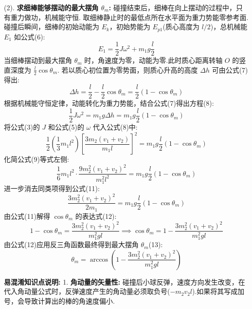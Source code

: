 (2). \textbf{求细棒能够摆动的最大摆角 $\theta_m$:}
碰撞结束后，细棒在向上摆动的过程中，只有重力做功，机械能守恒.
取细棒静止时的最低点所在水平面为重力势能零参考面.
碰撞后瞬间，细棒的初始动能为 $E_k$，初始势能为 $E_{p1}$(质心高度为 $l/2$)，总机械能 $E_1$ 如公式(6):
\begin{equation}
	E_1 = \frac{1}{2}J\omega^2 + m_1 g \frac{l}{2}
\end{equation}
当细棒摆动到最大摆角 $\theta_m$ 时，角速度为零，动能为零.此时质心距离转轴 $O$ 的竖直深度为 $\frac{l}{2}\cos\theta_m$.
若以质心初位置为零势面，则质心升高的高度 $\Delta h$ 可由公式(7)得出:
\begin{equation}
	\Delta h = \frac{l}{2} - \frac{l}{2}\cos\theta_m = \frac{l}{2}(1 - \cos\theta_m)
\end{equation}
根据机械能守恒定律，动能转化为重力势能，结合公式(7)得出方程(8):
\begin{equation}
	\frac{1}{2}J\omega^2 = m_1 g \Delta h = m_1 g \frac{l}{2}(1 - \cos\theta_m)
\end{equation}
将公式(3)的 $J$ 和公式(5)的 $\omega$ 代入公式(8)中:
\begin{equation}
	\frac{1}{2}\left(\frac{1}{3}m_1 l^2\right) \left[ \frac{3m_2(v_1 + v_2)}{m_1 l} \right]^2 = m_1 g \frac{l}{2}(1 - \cos\theta_m)
\end{equation}
化简公式(9)等式左侧:
\begin{equation}
	\frac{1}{6} m_1 l^2 \cdot \frac{9 m_2^2 (v_1 + v_2)^2}{m_1^2 l^2} = m_1 g \frac{l}{2}(1 - \cos\theta_m)
\end{equation}
进一步消去同类项得到公式(11):
\begin{equation}
	\frac{3 m_2^2 (v_1 + v_2)^2}{2 m_1} = m_1 g \frac{l}{2}(1 - \cos\theta_m)
\end{equation}
由公式(11)解得 $\cos\theta_m$ 的表达式(12):
\begin{equation}
	1 - \cos\theta_m = \frac{3 m_2^2 (v_1 + v_2)^2}{m_1^2 g l} \implies \cos\theta_m = 1 - \frac{3 m_2^2 (v_1 + v_2)^2}{m_1^2 g l}
\end{equation}
由公式(12)应用反三角函数最终得到最大摆角 $\theta_m$(13):
\begin{equation}
	\theta_m = \arccos\left(1 - \frac{3 m_2^2 (v_1 + v_2)^2}{m_1^2 g l}\right)
\end{equation}

\vspace{1em}

\textbf{易混淆知识点说明:}
1. \textbf{角动量的矢量性:} 碰撞后小球反弹，速度方向发生改变，在代入角动量公式时，反弹速度产生的角动量必须取负号($-m_2 v_2 l$).如果将其写成加号，会导致计算出的棒的角速度偏小.

